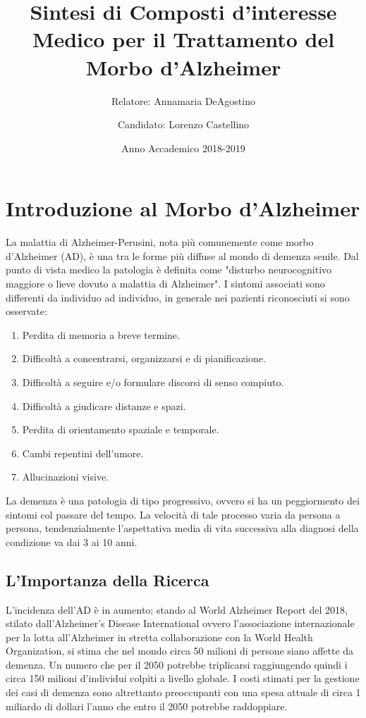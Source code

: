 \documentclass[a4paper, 12pt]{book}
\title{Sintesi di Composti d'interesse Medico per il Trattamento del Morbo d'Alzheimer}
\author{
	Relatore: Annamaria DeAgostino
	\and
	Candidato: Lorenzo Castellino
}
\date{Anno Accademico 2018-2019}
\begin{document}
\maketitle
\setcounter{page}{0}
\tableofcontents
\newpage
{}

\chapter*{Introduzione al Morbo d'Alzheimer}
La malattia di Alzheimer-Perusini, nota più comunemente come morbo d'Alzheimer (AD), è una tra le forme più diffuse al mondo di demenza senile. Dal punto di vista medico la patologia è definita come "disturbo neurocognitivo maggiore o lieve dovuto a malattia di Alzheimer".\cite{american_psychiatric_association_diagnostic_2013}
I sintomi associati sono differenti da individuo ad individuo, in generale nei pazienti riconosciuti si sono osservate:
\begin{enumerate}
	\item Perdita di memoria a breve termine.
	\item Difficoltà a concentrarsi, organizzarsi e di pianificazione.
	\item Difficoltà a seguire e/o formulare discorsi di senso compiuto.
	\item Difficoltà a giudicare distanze e spazi.
	\item Perdita di orientamento spaziale e temporale.
	\item Cambi repentini dell'umore.
	\item Allucinazioni visive.
\end{enumerate}
La demenza è una patologia di tipo progressivo, ovvero si ha un peggiormento dei sintomi col passare del tempo. La velocità di tale processo varia da persona a persona, tendenzialmente l'aspettativa media di vita successiva alla diagnosi della condizione va dai 3 ai 10 anni. \cite{todd_survival_2013}

\section{L'Importanza della Ricerca}
L'incidenza dell'AD è in aumento; stando al World Alzheimer Report del 2018, stilato dall'Alzheimer's Disease International ovvero l'associazione internazionale per la lotta all'Alzheimer in stretta collaborazione con la World Health Organization, si stima che nel mondo circa 50 milioni di persone siano affette da demenza. Un numero che per il 2050 potrebbe triplicarsi raggiungendo quindi i circa 150 milioni d'individui colpiti a livello globale.
I costi stimati per la gestione dei casi di demenza sono altrettanto preoccupanti con una spesa attuale di circa 1 miliardo di dollari l'anno che entro il 2050 potrebbe raddoppiare.\cite{noauthor_world_2018}







\end{document}
